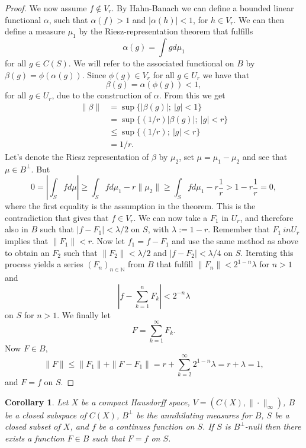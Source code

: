 \documentclass[a4paper,12pt,twoside,BCOR=10mm]{scrbook}
\newtheorem{corollary}{Corollary}
\begin{document}
\begin{proof}
We now assume $f \not \in V_r$.
By Hahn-Banach %
we can define a bounded linear functional $\alpha$, such that $\alpha(f) > 1$ and $|\alpha(h)| < 1$, for $h \in V_r$.
We can then define a measure $\mu_1$ by the Riesz-representation theorem %
that fulfills
\[
	\alpha(g) = \int g d\mu_1
\]
for all $g \in C(S)$.
We will refer to the associated functional on $B$ by $\beta(g) = \phi(\alpha(g))$.
Since $\phi(g) \in V_r$ for all $g \in U_r$ we have that
\[
	\beta(g) = \alpha(\phi(g)) < 1,
\]
for all $g \in U_r$,
	due to the construction of $\alpha$.
From this we get
\begin{align*}
	\| \beta \|
	&= \sup \{ |\beta(g)|;\ |g| < 1 \}\\
	&= \sup \{ (1/r)|\beta(g)|;\ |g| < r \}\\
	&\leq \sup \{ (1/r);\ |g| < r \}\\
	&= 1/r.
\end{align*}
Let's denote the Riesz representation of $\beta$ by $\mu_2$, set $\mu = \mu_1 - \mu_2$ and see that $\mu \in B^{\bot}$.
But
\[
	0 = \left | \int_S f d\mu \right | 
		\geq \int_S f d\mu_1 - r\|\mu_2\| 
		\geq \int_S f d\mu_1 - r\frac{1}{r}
		> 1 - r \frac{1}{r} = 0,
\]
where the first equality is the assumption in the theorem.
This is the contradiction that gives that $f \in V_r$.
We can now take a $F_1$ in $U_r$, and therefore also in $B$ such that $|f - F_1| < \lambda/2$ on $S$, with $\lambda := 1 - r$.
Remember that $F_1 \ in U_r$ implies that $\|F_1\| < r$.
Now let $f_1 = f - F_1$ and use the same method as above to obtain an $F_2$ such that $\|F_2\| < \lambda/2$ and $|f - F_2| < \lambda/4$ on $S$.
Iterating this process yields a series $(F_n)_{n \in \mathbb{N}}$ from $B$ that fulfill $\|F_n\| < 2^{1 - n}\lambda$ for $n > 1$ and
\[
	\left | f - \sum_{k = 1}^n F_k \right | < 2^{-n}\lambda
\]
on $S$ for $n > 1$.
We finally let 
\[
F = \sum_{k = 1}^{\infty} F_k.
\]
Now $F \in B$,
\[
	\|F\| \leq \|F_1\| + \|F - F_1\| = r + \sum_{k = 2}^{\infty}2^{1 - n}\lambda = r + \lambda = 1,
\]
and $F = f$ on $S$. %
\end{proof}
\begin{corollary}
Let $X$ be a compact Hausdorff space,
	$V = (C(X), \| \cdot \|_{\infty})$,
	$B$ be a closed subspace of $C(X)$,
	$B^{\bot}$ be the annihilating measures for $B$,
	$S$ be a closed subset of $X$,
	and $f$ be a continues function on $S$.
If $S$ is $B^{\bot}$-null %
then there exists a function $F \in B$ such that $F = f$ on $S$.
\end{corollary}
\end{document}
